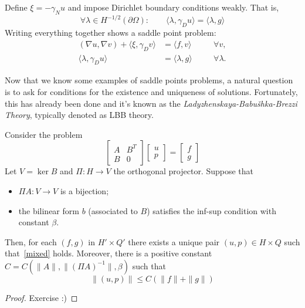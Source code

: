 \begin{itemize}
\begin{equation}
    \end{equation}
    Define $\xi = -\gamma_N u$ and impose Dirichlet boundary conditions weakly. That is,
    \begin{equation}
        \forall \lambda \in H^{-1/2}(\partial\Omega) \colon\qquad \langle \lambda, \gamma_D u \rangle = \langle \lambda, g \rangle
    \end{equation}
    Writing everything together shows a saddle point problem:
    \begin{equation}
        \begin{aligned}
            (\nabla u, \nabla v) + \langle \xi, \gamma_D v \rangle &= \langle f,v \rangle &&\quad \forall v,\\ 
            \langle \lambda, \gamma_D u \rangle &= \langle \lambda, g \rangle &&\quad  \forall \lambda.
        \end{aligned}
    \end{equation}
\end{itemize}

Now that we know some examples of saddle points problems, a natural question is to ask for conditions for the existence and uniqueness of solutions. Fortunately, this has already been done and it's known as the \emph{Ladyzhenskaya-Babu\v{s}hka-Brezzi Theory}, typically denoted as LBB theory.
\begin{theorem}
    Consider the problem
    \begin{equation*}\label{mixed}
        \begin{bmatrix}
            A & B^{T}\\ 
            B & 0
        \end{bmatrix}
        \begin{bmatrix}
            u \\ p
        \end{bmatrix}
        =
        \begin{bmatrix}
            f \\ g
        \end{bmatrix}
    \end{equation*}
    Let $V = \ker B$ and $\Pi\colon H\to V$ the orthogonal projector. Suppose that
    \begin{itemize}
        \item $\Pi A\colon V\to V$ is a bijection;
        \item the bilinear form $b$ (associated to $B$) satisfies the inf-sup condition with constant $\beta$.
    \end{itemize}
    Then, for each $(f,g)$ in $H'\times Q'$ there exists a unique pair $(u,p)\in H\times Q$ such that~\eqref{mixed} holds. Moreover, there is a positive constant $C=C(\|A\|, \| (\Pi A)^{-1}\|, \beta)$ such that
    \begin{equation*}
        \| (u,p) \| \le C \left( \|f\| + \|g\| \right) 
    \end{equation*}
    \begin{proof}
        Exercise :)
    \end{proof}
\end{theorem}

